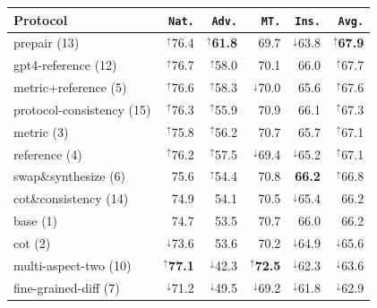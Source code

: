 \documentclass[11pt]{article}
\newcommand{\natshort}{\texttt{Nat.}\xspace}
\newcommand{\advshort}{\texttt{Adv.}\xspace}
\newcommand{\mtshort}{\texttt{MT.}\xspace}
\newcommand{\insshort}{\texttt{Ins.}\xspace}
\newcommand{\bettersig}{$^\uparrow$}
\newcommand{\worsesig}{$^\downarrow$}
\begin{document}
\begin{table}[t!]
\small
\centering
\addtolength{\tabcolsep}{-4.0pt} 
\begin{tabular}{lrrrrr}
\toprule
\textbf{Protocol} & \textbf{\natshort} & \textbf{\advshort} & \textbf{\mtshort}  & \textbf{\insshort} & \textbf{\texttt{Avg.}}\\
\midrule
  prepair (13)              & \bettersig76.4          & \bettersig\textbf{61.8} & 69.7                    & \worsesig63.8   & \bettersig\textbf{67.9} \\
 gpt4-reference (12)       & \bettersig76.7          & \bettersig58.0          & 70.1                    & 66.0            & \bettersig67.7          \\
 metric+reference (5)      & \bettersig76.6          & \bettersig58.3          & \worsesig70.0           & 65.6            & \bettersig67.6          \\
 protocol-consistency (15) & \bettersig76.3          & \bettersig55.9          & 70.9                    & 66.1            & \bettersig67.3          \\
 metric (3)                & \bettersig75.8          & \bettersig56.2          & 70.7                    & 65.7            & \bettersig67.1          \\
 reference (4)             & \bettersig76.2          & \bettersig57.5          & \worsesig69.4           & \worsesig65.2   & \bettersig67.1          \\
 swap\&synthesize (6)      & 75.6                    & \bettersig54.4          & 70.8                    & \textbf{66.2}   & \bettersig66.8          \\
 cot\&consistency (14)     & 74.9                    & 54.1                    & 70.5                    & \worsesig65.4   & 66.2                    \\
 base (1)                  & 74.7                    & 53.5                    & 70.7                    & 66.0            & 66.2                    \\
 cot (2)                   & \worsesig73.6           & 53.6                    & 70.2                    & \worsesig64.9   & \worsesig65.6           \\
 multi-aspect-two (10)     & \bettersig\textbf{77.1} & \worsesig42.3           & \bettersig\textbf{72.5} & \worsesig62.3   & \worsesig63.6           \\
 fine-grained-diff (7)     & \worsesig71.2           & \worsesig49.5           & \worsesig69.2           & \worsesig61.8   & \worsesig62.9           \\

\end{tabular}
\end{table}
\end{document}
